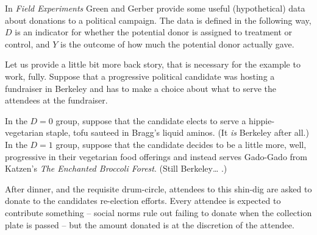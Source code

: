 \documentclass[
]{book}
\begin{document}
In \emph{Field Experiments} Green and Gerber provide some useful
(hypothetical) data about donations to a political campaign. The data is
defined in the following way, \(D\) is an indicator for whether the
potential donor is assigned to treatment or control, and \(Y\) is the
outcome of how much the potential donor actually gave.

Let us provide a little bit more back story, that is necessary for the
example to work, fully. Suppose that a progressive political candidate
was hosting a fundraiser in Berkeley and has to make a choice about what
to serve the attendees at the fundraiser.

In the \(D = 0\) group, suppose that the candidate elects to serve a
hippie-vegetarian staple, tofu sauteed in Bragg's liquid aminos. (It
\emph{is} Berkeley after all.) In the \(D=1\) group, suppose that the
candidate decides to be a little more, well, progressive in their
vegetarian food offerings and instead serves Gado-Gado from Katzen's
\emph{The Enchanted Broccoli Forest}. (Still Berkeley\ldots{} .)

After dinner, and the requisite drum-circle, attendees to this shin-dig
are asked to donate to the candidates re-election efforts. Every
attendee is expected to contribute something -- social norms rule out
failing to donate when the collection plate is passed -- but the amount
donated is at the discretion of the attendee.
\end{document}
